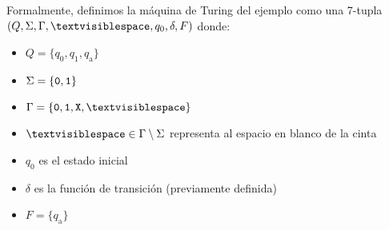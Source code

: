 \documentclass{article}
\theoremstyle{definition}
\begin{document}
Formalmente, definimos la máquina de Turing del ejemplo como una 7-tupla
\((Q, \Sigma, \Gamma, \textvisiblespace, q_0, \delta, F)\) donde:
 \begin{itemize}
   \item \(Q = \{q_0, q_1, q_{\text{a}}\}\)
   \item \(\Sigma = \{{\tt 0,1}\}\)
   \item \(\Gamma = \{{\tt 0,1, X, \textvisiblespace}\}\)
   \item \(\textvisiblespace \in \Gamma \setminus \Sigma\) representa al
   espacio en blanco de la cinta
   \item \(q_0\) es el estado inicial
   \item \(\delta\) es la función de transición (previamente definida)
   \item \(F = \{ q_{\text{a}} \}\)
 \end{itemize}


%
%
\end{document}
